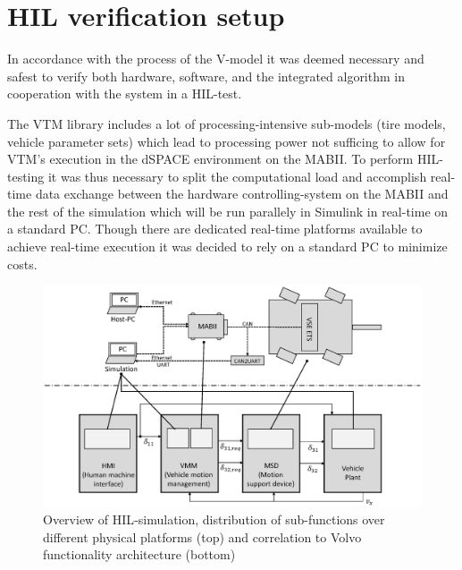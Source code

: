 \documentclass[root.tex]{subfiles}
\begin{document}
{\pagestyle{empty}}
\section{\gls{HIL} verification setup}
\label{chap:HiL-Architecture}


In accordance with the process of the V-model \cite{automotive_software_engineering} it was deemed necessary and safest to verify both hardware, software, and the integrated algorithm in cooperation with the system in a \gls{HIL}-test. 

The \gls{VTM} library includes a lot of processing-intensive sub-models (tire models, vehicle parameter sets) which lead to processing power not sufficing to allow for \gls{VTM}'s execution in the dSPACE environment on the \gls{MABII}. To perform \gls{HIL}-testing it was thus necessary to split the computational load and accomplish real-time data exchange between the hardware controlling-system on the \gls{MABII} and the rest of the simulation which will be run parallely in Simulink in real-time on a standard PC. Though there are dedicated real-time platforms available to achieve real-time execution it was decided to rely on a standard PC to minimize costs.%

\begin{figure}[htb]
	\centering
	\includegraphics[width=1\linewidth]{HIL_overview}
	\caption[Overview of \acrlong{HIL}-simulation, distribution of sub-functions over different physical platforms (top) and correlation to Volvo functionality architecture (bottom)]{Overview of \gls{HIL}-simulation, distribution of sub-functions over different physical platforms (top) and correlation to Volvo functionality architecture (bottom)}
	
	\label{fig:HIL_overview}
\end{figure}
\end{document}
